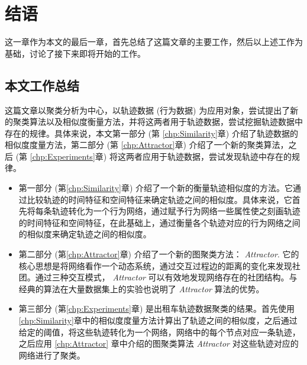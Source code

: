 

\chapter{结语}
这一章作为本文的最后一章，首先总结了这篇文章的主要工作，然后以上述工作为基础，讨论了接下来即将开始的工作。

\section{本文工作总结}

这篇文章以聚类分析为中心，以轨迹数据 (行为数据) 为应用对象，尝试提出了新的聚类算法以及相似度衡量方法，并将这两者用于轨迹数据，尝试挖掘轨迹数据中存在的规律。具体来说，本文第一部分 (第 \ref{chp:Similarity}章) 介绍了轨迹数据的相似度度量方法，第二部分 (第 \ref{chp:Attractor}章) 介绍了一个新的聚类算法，之后 (第 \ref{chp:Experiments}章) 将这两者应用于轨迹数据，尝试发现轨迹中存在的规律。

\vspace{2mm}
\begin{itemize}
\vspace{1mm}
\item \hspace{2mm} 第一部分 (第\ref{chp:Similarity}章) 介绍了一个新的衡量轨迹相似度的方法。它通过比较轨迹的时间特征和空间特征来确定轨迹之间的相似度。具体来说，它首先将每条轨迹转化为一个行为网络，通过赋予行为网络一些属性使之刻画轨迹的时间特征和空间特征，在此基础上，通过衡量各个轨迹对应的行为网络之间的相似度来确定轨迹之间的相似度。
\vspace{1mm}
\item \hspace{2mm} 第二部分 (第\ref{chp:Attractor}章) 介绍了一个新的图聚类方法： \emph{Attractor}. 它的核心思想是将网络看作一个动态系统，通过交互过程边的距离的变化来发现社团。通过三种交互模式， \emph{Attractor} 可以有效地发现网络存在的社团结构。与经典的算法在大量数据集上的实验也说明了 \emph{Attractor} 算法的优势。
\vspace{1mm}
\item \hspace{2mm} 第三部分 (第\ref{chp:Experiments}章) 是出租车轨迹数据聚类的结果。首先使用 \ref{chp:Similarity}章中的相似度度量方法计算出了轨迹之间的相似度，之后通过给定的阈值，将这些轨迹转化为一个网络，网络中的每个节点对应一条轨迹，之后应用 \ref{chp:Attractor} 章中介绍的图聚类算法 \emph{Attractor} 对这些轨迹对应的网络进行了聚类。
\end{itemize}

